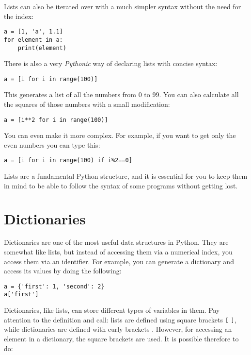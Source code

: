 Lists can also be iterated over with a much simpler syntax without the need for the index:

\begin{verbatim}
a = [1, 'a', 1.1]
for element in a:
    print(element)
\end{verbatim}

There is also a very \emph{Pythonic} way of declaring lists with concise syntax:

\begin{verbatim}
a = [i for i in range(100)]
\end{verbatim}

This generates a list of all the numbers from 0 to 99. You can also calculate all the squares of those numbers with a small modification:

\begin{verbatim}
a = [i**2 for i in range(100)]
\end{verbatim}

You can even make it more complex. For example, if you want to get only the even numbers you can type this:

\begin{verbatim}
a = [i for i in range(100) if i%2==0]
\end{verbatim}


Lists are a fundamental Python structure, and it is essential for you to keep them in mind to be able to follow the syntax of some programs without getting lost.

\section{Dictionaries}\label{sec:dictionaries}
Dictionaries are one of the most useful data structures in Python. They are somewhat like lists, but instead of accessing them via a numerical index, you access them via an identifier. For example, you can generate a dictionary and access its values by doing the following:

\begin{verbatim}
a = {'first': 1, 'second': 2}
a['first']
\end{verbatim}

Dictionaries, like lists, can store different types of variables in them. Pay attention to the definition and call: lists are defined using square brackets \texttt{[} \texttt{]}, while dictionaries are defined with curly brackets \texttt{{}}. However, for accessing an element in a dictionary, the square brackets are used. It is possible therefore to do:

